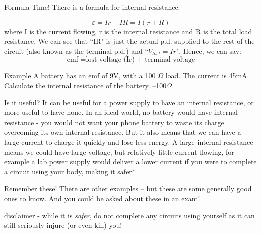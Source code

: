 \documentclass[../Main.tex]{subfiles}
\begin{document}
\begin{frame}{Formula Time!}
    There is a formula for internal resistance:
    
    \begin{equation*}
        \varepsilon = Ir + IR = I(r+R)
    \end{equation*}
    where I is the current flowing, r is the internal resistance and R is the total load resistance. \pause \newline
    \newline
    We can see that ``IR" is just the actual p.d. supplied to the rest of the circuit (also known as the terminal p.d.) and ``$V_{lost}=Ir$". Hence, we can say:
    \begin{equation*}
        \mbox{emf }= \mbox{lost voltage (Ir) + terminal voltage}
    \end{equation*}
    
    \begin{exampleblock}{Example}
    A battery has an emf of 9V, with a 100 $\Omega$ load. The current is 45mA. Calculate the internal resistance of the battery. \pause
    --100$\Omega$
    \end{exampleblock}
\end{frame}

\begin{frame}{Is it useful?}
    It can be useful for a power supply to have an internal resistance, or more useful to have none. 
    \newline \newline
    In an ideal world, no battery would have internal resistance - you would not want your phone battery to waste its charge overcoming its own internal resistance. But it also means that we can have a large current to charge it quickly and lose less energy.
    \pause
    \newline \newline
    A large internal resistance means we could have large voltage, but relatively little current flowing, for example a lab power supply would deliver a lower current if you were to complete a circuit using your body, making it safer*
    \pause
    \begin{block}{Remember these!}
    There are other examples -- but these are some generally good ones to know. And you could be asked about these in an exam!
    \end{block}
    {\tiny *disclaimer - while it is \emph{safer}, do not complete any circuits using yourself as it can still seriously injure (or even kill) you!}
\end{frame}
\end{document}
